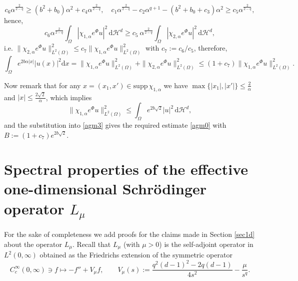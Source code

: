 \documentclass[11pt,oneside,reqno,a4paper]{amsart}
\newcommand{\dd}{\mathrm{d}}
\renewcommand{\H}{\mathcal{H}}
\theoremstyle{definition}
\begin{document}
\[
c_6 \alpha^{\frac{2}{2-q}}\ge (b^2+b_0)\alpha^2+c_4\alpha^{\frac{2}{2-q}},
\quad
c_1\alpha^{\frac{2}{2-q}}-c_2 \alpha^{q+1}-(b^2+b_0+c_3)\alpha^2\ge c_5 \alpha^{\frac{2}{2-q}},
\]
hence,
\[
c_6 \alpha^{\frac{2}{2-q}}\int_{\Omega}|\chi_{1,\alpha}e^{\Phi}u|^2\, \dd \H^d
\ge c_5\  \alpha^{\frac{2}{2-q}}\int_{\Omega}|\chi_{2,\alpha}e^{\Phi}u|^2\, \dd \H^d,
\]
i.e. $\|\chi_{2,\alpha}e^{\Phi}u\|^2_{L^2(\Omega)}\le c_7\|\chi_{1,\alpha}e^{\Phi}u\|^2_{L^2(\Omega)}$  with $c_7:=c_6/c_5$,
therefore,
\begin{equation}
	\label{agm3}
\int_{\Omega}e^{2b\alpha|x|}\big|u(x)\big|^2\dd x=\|\chi_{1,\alpha} e^{\Phi}u\|^2_{L^2(\Omega)}+\|\chi_{2,\alpha} e^{\Phi}u\|^2_{L^2(\Omega)}
\le (1+c_7)\|\chi_{1,\alpha} e^{\Phi}u\|^2_{L^2(\Omega)}.
\end{equation}

Now remark that for any $x=(x_1,x')\in\mathrm{supp}\,\chi_{1,\alpha}$ we have $\max\big\{|x_1|,|x'|\big\}\le\frac{2}{\alpha}$
and $|x|\le \frac{2\sqrt{2}}{\alpha}$, which implies
\[
\|\chi_{1,\alpha} e^{\Phi}u\|^2_{L^2(\Omega)}
\le \int_{\Omega}e^{2b\sqrt{2}}|u|^2\, \dd \H^d,
\]
and the substitution into \eqref{agm3} gives the required estimate \eqref{agm0} with $B:=(1+c_7) e^{2b\sqrt{2}}$.




\appendix


\section{Spectral properties of the effective one-dimensional Schr\"odinger operator $L_\mu$}\label{appa}

For the sake of completeness we add proofs for the claims made in Section \ref{sec1d} about the operator $L_\mu$.
Recall that $L_\mu$ (with $\mu>0$) is the self-adjoint operator in $L^2(0,\infty)$ obtained as the Friedrichs extension
of the symmetric operator
\[
	C_c^\infty(0,\infty) \ni f \mapsto -f'' + V_\mu f, \qquad
	V_\mu(s):=\frac{q^2(d-1)^2-2q(d-1)}{4s^2}-\frac{\mu}{s^q}.
\]
\end{document}
